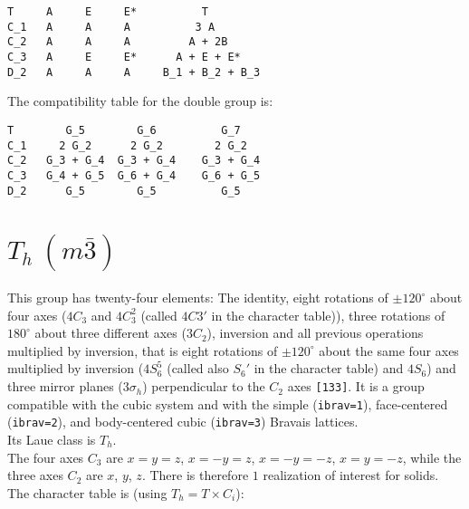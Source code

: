 \documentclass[12pt,a4paper,twoside]{report}
\begin{document}
\begin{tcolorbox}
\begin{footnotesize}
\begin{verbatim}
T     A     E     E*          T
C_1   A     A     A          3 A
C_2   A     A     A         A + 2B  
C_3   A     E     E*      A + E + E*
D_2   A     A     A     B_1 + B_2 + B_3
\end{verbatim}
\end{footnotesize}
\end{tcolorbox}

The compatibility table for the double group is:

\begin{tcolorbox}
\begin{footnotesize}
\begin{verbatim}
T        G_5        G_6          G_7   
C_1     2 G_2      2 G_2        2 G_2
C_2   G_3 + G_4  G_3 + G_4    G_3 + G_4
C_3   G_4 + G_5  G_6 + G_4    G_6 + G_5
D_2      G_5        G_5          G_5
\end{verbatim}
\end{footnotesize}
\end{tcolorbox}

\newpage
{\color{coral}\section{$T_h\ (m\bar 3)$}}
\color{black}
This group has twenty-four elements: The identity, eight rotations 
of $\pm120^\circ$ about four axes ($4C_3$ and $4C_3^2$ (called $4C3'$ in the 
character table)), three rotations of $180^\circ$ about three different axes 
($3C_2$), inversion and all previous operations multiplied by inversion, that is
eight rotations of $\pm120^\circ$ about the same four axes multiplied by inversion
($4S_6^5$ (called also $S_6'$ in the character table) and $4S_6$) and three 
mirror planes ($3\sigma_h$) perpendicular to the $C_2$ axes \texttt{[133]}.
It is a group compatible with the cubic system and with the  
simple (\texttt{ibrav=1}), face-centered (\texttt{ibrav=2}), 
and body-centered cubic (\texttt{ibrav=3}) Bravais lattices. \\
Its Laue class is $T_{h}$. \\
The four axes $C_3$ are $x=y=z$, $x=-y=z$, $x=-y=-z$, $x=y=-z$, while
the three axes $C_2$ are $x$, $y$, $z$. There is therefore $1$
realization of interest for solids. \\
The character table is (using $T_h= T \times C_i$):
\end{document}
